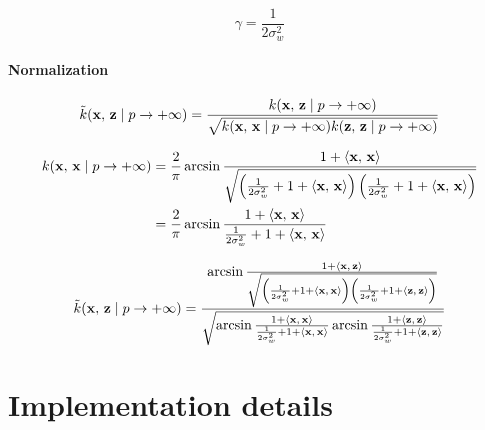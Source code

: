 \begin{equation}
    \gamma = \frac{1}{2\sigma_w^2}
\end{equation}

\paragraph{Normalization}

\begin{equation}
    \tilde{k}(\mathbf{x},\,\mathbf{z} \mid p \to + \infty) = \frac{
        k(\mathbf{x},\,\mathbf{z} \mid p \to + \infty) }{
        \sqrt{
            k(\mathbf{x},\,\mathbf{x} \mid p \to + \infty)
            k(\mathbf{z},\,\mathbf{z} \mid p \to + \infty)
        }
    }
\end{equation}

\begin{align*}
    k(\mathbf{x},\,\mathbf{x} \mid p \to + \infty)
     & = \frac{2}{\pi}
    \arcsin \frac{1 + \left\langle \mathbf{x},\,\mathbf{x} \right\rangle}{\sqrt{
            \left(
            \frac{1}{2\sigma_w^2} + 1 + \left\langle \mathbf{x},\,\mathbf{x} \right\rangle
            \right)
            \left(
            \frac{1}{2\sigma_w^2} + 1 + \left\langle \mathbf{x},\,\mathbf{x} \right\rangle
            \right)
    }}                 \\
     & = \frac{2}{\pi}
    \arcsin \frac{1 + \left\langle \mathbf{x},\,\mathbf{x} \right\rangle}{
        \frac{1}{2\sigma_w^2} + 1 + \left\langle \mathbf{x},\,\mathbf{x} \right\rangle
    }
\end{align*}

\begin{equation}
    \tilde{k}(\mathbf{x},\,\mathbf{z} \mid p \to + \infty) =
    \frac{
        \arcsin \frac{1 + \left\langle \mathbf{x},\,\mathbf{z} \right\rangle}{\sqrt{
                \left(
                \frac{1}{2\sigma_w^2} + 1 + \left\langle \mathbf{x},\,\mathbf{x} \right\rangle
                \right)
                \left(
                \frac{1}{2\sigma_w^2} + 1 + \left\langle \mathbf{z},\,\mathbf{z} \right\rangle
                \right)
            }}
    }{
        \sqrt{
            \arcsin \frac{1 + \left\langle \mathbf{x},\,\mathbf{x} \right\rangle}{
                \frac{1}{2\sigma_w^2} + 1 + \left\langle \mathbf{x},\,\mathbf{x} \right\rangle
            }
            \arcsin \frac{1 + \left\langle \mathbf{z},\,\mathbf{z} \right\rangle}{
                \frac{1}{2\sigma_w^2} + 1 + \left\langle \mathbf{z},\,\mathbf{z} \right\rangle
            }
        }
    }
\end{equation}

\section{Implementation details}

